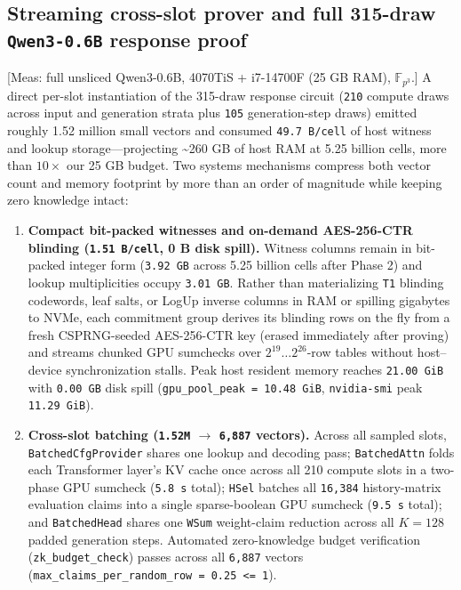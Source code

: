 \documentclass[10pt]{article}
\begin{document}
\subsection{Streaming cross-slot prover and full 315-draw \texttt{Qwen3-0.\allowbreak{}6B} response proof}
[Meas: full unsliced Qwen3-0.6B, 4070TiS + i7-14700F (25 GB RAM), $\mathbb F_{p^3}$.] A direct per-slot instantiation of the 315-draw response circuit (\texttt{210} compute draws across input and generation strata plus \texttt{105} generation-step draws) emitted roughly 1.52 million small vectors and consumed \texttt{49.\allowbreak{}7 B/cell} of host witness and lookup storage---projecting \textasciitilde{}260 GB of host RAM at 5.25 billion cells, more than $10\times$ our 25 GB budget. Two systems mechanisms compress both vector count and memory footprint by more than an order of magnitude while keeping zero knowledge intact:

\begin{enumerate}
\item{} \textbf{Compact bit-packed witnesses and on-demand AES-256-CTR blinding (\texttt{1.\allowbreak{}51 B/cell}, 0 B disk spill).} Witness columns remain in bit-packed integer form (\texttt{3.\allowbreak{}92 GB} across 5.25 billion cells after Phase 2) and lookup multiplicities occupy \texttt{3.\allowbreak{}01 GB}. Rather than materializing \texttt{T1} blinding codewords, leaf salts, or LogUp inverse columns in RAM or spilling gigabytes to NVMe, each commitment group derives its blinding rows on the fly from a fresh CSPRNG-seeded AES-256-CTR key (erased immediately after proving) and streams chunked GPU sumchecks over $2^{19}\dots 2^{26}$-row tables without host--device synchronization stalls. Peak host resident memory reaches \texttt{21.\allowbreak{}00 GiB} with \texttt{0.\allowbreak{}00 GB} disk spill (\texttt{gpu\_\allowbreak{}pool\_\allowbreak{}peak = 10.\allowbreak{}48 GiB}, \texttt{nvidia-smi} peak \texttt{11.\allowbreak{}29 GiB}).
\item{} \textbf{Cross-slot batching (\texttt{1.\allowbreak{}52M} $\to$ \texttt{6,887} vectors).} Across all sampled slots, \texttt{BatchedCfgProvider} shares one lookup and decoding pass; \texttt{BatchedAttn} folds each Transformer layer's KV cache once across all 210 compute slots in a two-phase GPU sumcheck (\texttt{5.\allowbreak{}8 s} total); \texttt{HSel} batches all \texttt{16,384} history-matrix evaluation claims into a single sparse-boolean GPU sumcheck (\texttt{9.\allowbreak{}5 s} total); and \texttt{BatchedHead} shares one \texttt{WSum} weight-claim reduction across all $K=128$ padded generation steps. Automated zero-knowledge budget verification (\texttt{zk\_\allowbreak{}budget\_\allowbreak{}check}) passes across all \texttt{6,887} vectors (\texttt{max\_\allowbreak{}claims\_\allowbreak{}per\_\allowbreak{}random\_\allowbreak{}row = 0.\allowbreak{}25 <= 1}).
\end{enumerate}
\end{document}
